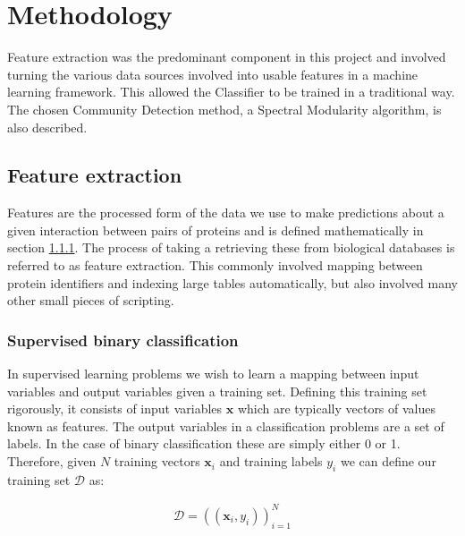 \chapter{Methodology}
\label{methods}

Feature extraction was the predominant component in this project and involved turning the various data sources involved into usable features in a machine learning framework.
This allowed the Classifier to be trained in a traditional way.
The chosen Community Detection method, a Spectral Modularity algorithm, is also described.

\section{Feature extraction}

Features are the processed form of the data we use to make predictions about a given interaction between pairs of proteins and is defined mathematically in section \ref{supbinclass}.
The process of taking a retrieving these from biological databases is referred to as feature extraction.
This commonly involved mapping between protein identifiers and indexing large tables automatically, but also involved many other small pieces of scripting.

\subsection{Supervised binary classification}
\label{supbinclass}

In supervised learning problems we wish to learn a mapping between input variables and output variables given a training set.
Defining this training set rigorously, it consists of input variables $\pmb{x}$ which are typically vectors of values known as features.
The output variables in a classification problems are a set of labels\autocite[2]{murphy_machine_2012}.
In the case of binary classification these are simply either 0 or 1.
Therefore, given $N$ training vectors $\pmb{x}_{i}$ and training labels $y_{i}$ we can define our training set $\mathcal{D}$ as:

\begin{align}
    \mathcal{D} = \left( ( \pmb{x}_{i}, y_{i} ) \right)_{i=1}^{N}
\end{align}


